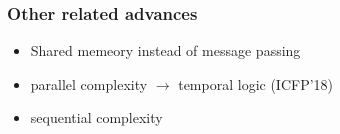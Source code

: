 \documentclass{article}
\begin{document}
	
	\subsubsection{Other related advances}
	\begin{itemize}
		\item Shared memeory instead of message passing
		\item parallel complexity $\longrightarrow$ temporal logic (ICFP'18)
		\item sequential complexity
	\end{itemize}
	
	
	
	
	
	
	
	
	
\end{document}
